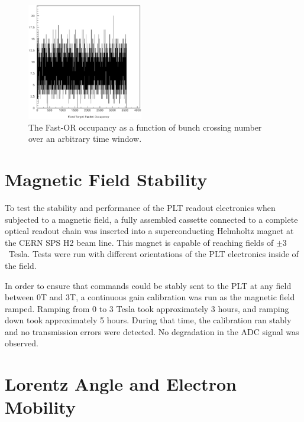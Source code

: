 \documentclass[journal]{IEEEtran}
\begin{document}
\begin{figure}[!h]
\centering
\includegraphics[width=0.45\textwidth]{histogram}
\caption{ The Fast-OR occupancy as a function of bunch crossing number over an arbitrary time window.  }
\label{fig:fastor}
\end{figure}

%
%

%
\section{Magnetic Field Stability}

To test the stability and performance of the PLT readout electronics when subjected to a magnetic field, a fully assembled cassette connected to a complete optical readout chain was inserted into a superconducting Helmholtz magnet at the CERN SPS H2 beam line.  This magnet is capable of reaching fields of $\pm 3$~Tesla.  Tests were run with different orientations of the PLT electronics inside of the field. 

In order to ensure that commands could be stably sent to the PLT at any field between 0T and 3T, a continuous gain calibration was run as the magnetic field ramped.  Ramping from 0 to 3 Tesla took approximately 3 hours, and ramping down took approximately 5 hours.  During that time, the calibration ran stably and no transmission errors were detected.  No degradation in the ADC signal was observed.

%
%
\section{Lorentz Angle and Electron Mobility}
\end{document}
